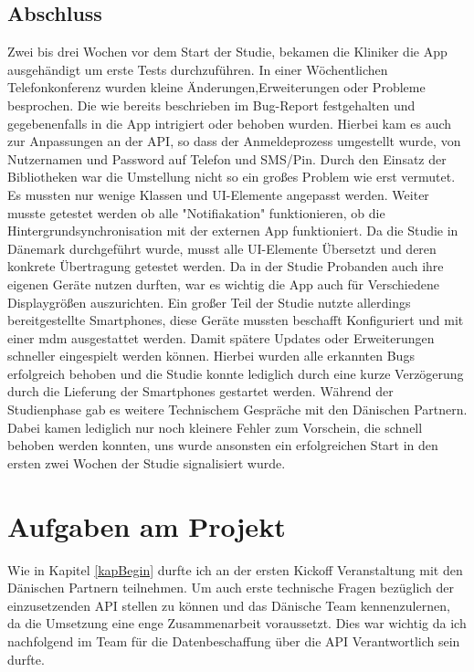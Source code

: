 \subsection{Abschluss}\label{abschluss}
Zwei bis drei Wochen vor dem Start der Studie, bekamen die Kliniker die App ausgehändigt um erste Tests durchzuführen. In einer Wöchentlichen Telefonkonferenz wurden kleine Änderungen,Erweiterungen oder  Probleme besprochen. Die wie bereits beschrieben im Bug-Report festgehalten  und gegebenenfalls in die App intrigiert oder behoben wurden. Hierbei kam es auch  zur Anpassungen an der API, so dass der Anmeldeprozess umgestellt wurde, von Nutzernamen und Password auf Telefon und SMS/Pin. Durch den Einsatz der Bibliotheken war die Umstellung nicht so ein großes Problem wie erst vermutet. Es mussten nur wenige Klassen und UI-Elemente angepasst werden. Weiter musste getestet werden ob alle "Notifiakation" funktionieren, ob die Hintergrundsynchronisation mit der externen App funktioniert. Da die Studie in Dänemark durchgeführt wurde, musst  alle UI-Elemente Übersetzt und deren konkrete Übertragung getestet werden. Da in der Studie Probanden auch ihre eigenen Geräte nutzen durften, war es wichtig die App auch für Verschiedene Displaygrößen auszurichten. Ein großer Teil der Studie nutzte allerdings bereitgestellte Smartphones, diese Geräte mussten beschafft Konfiguriert und mit einer \ac{mdm}%
ausgestattet werden. Damit spätere Updates oder Erweiterungen schneller eingespielt werden können. Hierbei wurden alle erkannten Bugs erfolgreich behoben und die Studie konnte lediglich durch eine kurze Verzögerung durch die Lieferung der Smartphones gestartet werden. Während der Studienphase gab es weitere Technischem Gespräche mit den Dänischen Partnern. Dabei kamen lediglich nur noch kleinere Fehler zum Vorschein, die schnell behoben werden konnten, uns wurde ansonsten ein erfolgreichen Start in den ersten zwei Wochen der Studie signalisiert wurde. 

\section{Aufgaben am Projekt}
Wie in Kapitel \ref{kapBegin} durfte ich an der ersten Kickoff Veranstaltung mit den Dänischen Partnern teilnehmen. Um auch erste technische Fragen bezüglich der einzusetzenden API stellen zu können und das Dänische Team kennenzulernen, da die Umsetzung eine enge Zusammenarbeit voraussetzt. Dies war wichtig da ich nachfolgend im Team für die Datenbeschaffung über die API Verantwortlich sein durfte.

